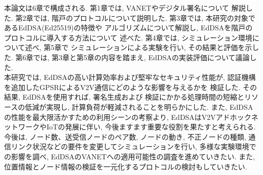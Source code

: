 本論文は6章で構成される. 第1章では, VANETやデジタル署名について
解説した. 第2章では, 階戸\cite{shinato}のプロトコルについて説明した. 
第3章では, 本研究の対象であるEdDSA(Ed25519)の特徴や
アルゴリズムについて解説し, EdDSAを階戸のプロトコルに導入する方法について
述べた. 第4章では, シミュレーション環境について述べ, 第5章で
シミュレーションによる実験を行い, その結果と評価を示した. 
第6章では, 第3章と第5章の内容を踏まえ, EdDSAの実装評価について議論した. \\
\indent 本研究では, EdDSAの高い計算効率および堅牢なセキュリティ性能が, 
認証機構を追加したGPSRによるV2V通信にどのような影響を与えるかを
検証した. その結果, EdDSAを使用すれば, 署名生成および
検証にかかる処理時間の短縮とリソースの低減が実現し, 計算負荷が軽減されることを明らかにした. 
また, EdDSAの性能を最大限活かすための利用シーンの考察より, 
EdDSAはV2VアドホックネットワークやIoTの発展に伴い, 
今後ますます重要な役割を果たすと考えられる.\\
\indent 今後は, ノード数、送受信ノードのペア数, ノードの動き, 不正ノードの種類, 
通信リンク状況などの要件を変更してシミュレーションを行い, 
多様な実験環境での影響を調べ, EdDSAのVANETへの適用可能性の調査を進めていきたい. 
また, 位置情報とノード情報の検証を一元化するプロトコルの検討もしていきたい. 
